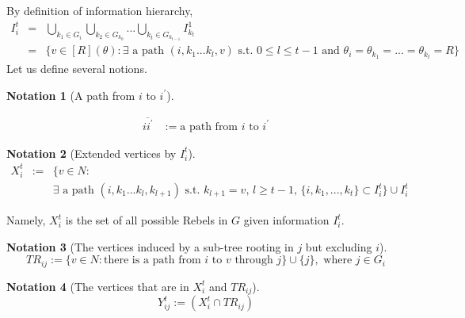 \documentclass[12pt,letter]{article}
\theoremstyle{definition}
\theoremstyle{definition}
\newtheorem{notation}{Notation}[section]
\theoremstyle{remark}
\theoremstyle{claim}
\begin{document}
By definition of information hierarchy, 
\begin{eqnarray*}
I^t_i & = & \bigcup_{k_1\in G_i}\bigcup_{k_2\in G_{k_0}}...\bigcup_{k_{t}\in G_{k_{t-1}}}I^1_{k_{t}}\\
&= & \{v\in [R](\theta): \text{$\exists$ a path $(i,k_1...k_{l},v)$ s.t.~$0\leq l\leq t-1$ and $\theta_i=\theta_{k_1}=...=\theta_{k_l}=R$}\}
\end{eqnarray*}
Let us define several notions.

%
%
\begin{notation}[A path from $i$ to $i^{'}$]
\label{def:the_network_path}

\begin{eqnarray*}
\overline{ii^{'}} & := \text{a path from $i$ to $i^{'}$}
\end{eqnarray*}
\end{notation}

\begin{notation}[Extended vertices by $I^t_i$]
\label{def:ext_tree}
\begin{eqnarray*}
X^t_i & := &  \{v\in N: \\
	& & \text{$\exists$ a path $(i,k_1...k_{l},k_{l+1})$ s.t.~$k_{l+1}=v$, $l\geq t-1$, $\{i,k_1,...,k_{t}\}\subset I^t_i$}\}\cup I^t_i
\end{eqnarray*}
\end{notation}
Namely, $X^t_i $ is the set of all possible Rebels in $G$ given information $I^t_i$. 

\begin{notation}[The vertices induced by a sub-tree rooting in $j$ but excluding $i$]
\[TR_{ij}:= \{v\in N:\text{there is a path from $i$ to $v$ through $j$}\}\cup\{j\},\text{ where $j\in G_i$}\]
\end{notation}


\begin{notation}[The vertices that are in $X^t_i$ and $TR_{ij}$]
\[Y^t_{ij}:= (X^t_i\cap TR_{ij})\]
\end{notation}
\end{document}
